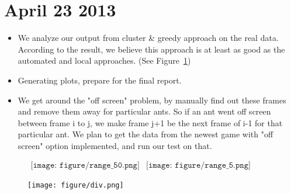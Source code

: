 \documentclass[12pt]{article}
\begin{document}
\section{April 23 2013}
\begin{itemize}
\item We analyze our output from cluster \& greedy approach on the real data. According to the result, we believe this approach is at least as good as the automated and local approaches. (See Figure~\ref{fig1})
\item Generating plots, prepare for the final report.
\item We get around the "off screen" problem, by manually find out these frames and remove them away for particular ants. So if an ant went off screen between frame i to j, we make frame j+1 be the next frame of i-1 for that particular ant. We plan to get the data from the newest game with "off screen" option implemented, and run our test on that.
\end{itemize}
\begin{figure}[h]
\label{fig1}
 \begin{center}$
 \begin{array}{cc}
 \texttt{[image: figure/range\_50.png]} &
 \texttt{[image: figure/range\_5.png]}
 \end{array}$
 \end{center}
 \end{figure}
\begin{figure}[h]
\label{fig2}
 \begin{center}
 \texttt{[image: figure/div.png]}
 \end{center}
 \end{figure}
\end{document}
